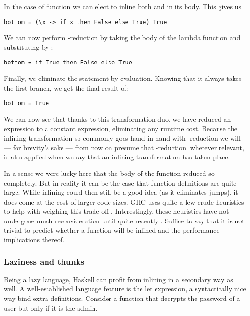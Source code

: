 In the case of  function we can elect to inline both  and 
in its body. This gives us 

\begin{listing}[H]
\begin{verbatim}
bottom = (\x -> if x then False else True) True
\end{verbatim}
\end{listing}

We can now perform \textbeta-reduction by taking the body of the lambda function
and substituting  by :

\begin{listing}[H]
\begin{verbatim}
bottom = if True then False else True
\end{verbatim}
\end{listing}

Finally, we eliminate the  statement by evaluation. Knowing that it always takes the first branch, we
get the final result of:

\begin{listing}[H]
\begin{verbatim}
bottom = True
\end{verbatim}
\end{listing}

We can now see that thanks to this transformation duo, we have reduced an expression to a constant
expression, eliminating any runtime cost. Because the inlining transformation so commonly goes hand
in hand with \textbeta-reduction we will --- for brevity's sake --- from now on presume that \textbeta-reduction,
wherever relevant, is also applied when we say that an inlining transformation has taken place.

In a sense we were lucky here that the body of the  function reduced so completely. But in reality
it can be the case that function definitions are quite large. While inlining could then still be a good idea (as it eliminates jumps),
it does come at the cost of larger code sizes. GHC uses quite a few crude heuristics to help with weighing this trade-off \cite{haskell_optimisations_1997}.
Interestingly, these heuristics have not undergone much reconsideration until quite recently \cite{inling_magic_numbers}. 
Suffice to say that it is not trivial to predict whether a function will be inlined and the performance implications thereof.

\subsubsection{Laziness and thunks}
Being a lazy language, Haskell can profit from inlining in a secondary way as well. A well-established
language feature is the let expression, a syntactically nice way bind extra definitions. Consider a function
that decrypts the password of a user but only if it is the admin.

